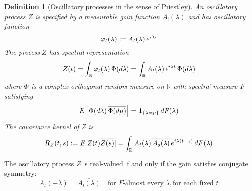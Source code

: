 \documentclass{article}
\newcommand{\assign}{:=}
\newtheorem{definition}{Definition}
{\theorembodyfont{\rmfamily}\newtheorem{remark}{Remark}}
\begin{document}
\begin{definition}
  [Oscillatory processes in the sense of Priestley] An oscillatory process $Z$
  is specified by a measurable gain function $A_t (\lambda)$ and has
  oscillatory function
  \begin{equation}
    \varphi_t (\lambda) \assign A_t (\lambda)  \hspace{0.17em} e^{i \lambda t}
  \end{equation}
  The process $Z$ has spectral representation
  \begin{equation}
    Z (t) = \int_{\mathbb{R}} \varphi_t (\lambda)  \hspace{0.17em} \Phi (d
    \lambda) = \int_{\mathbb{R}} A_t (\lambda)  \hspace{0.17em} e^{i \lambda
    t}  \hspace{0.17em} \Phi (d \lambda)
  \end{equation}
  where $\Phi$ is a complex orthogonal random measure on $\mathbb{R}$ with
  spectral measure $F$ satisfying
  \begin{equation}
    E \left[ \Phi (d \lambda) \hspace{0.17em} \overline{\Phi (d \mu)} \right]
    = \textbf{1}_{\{\lambda = \mu\}}  \hspace{0.17em} dF (\lambda)
  \end{equation}
  The covariance kernel of $Z$ is
  \begin{equation}
    R_Z (t, s) \assign E [Z (t) \overline{Z (s)}] = \int_{\mathbb{R}} A_t
    (\lambda) \hspace{0.17em} \overline{A_s (\lambda)} \hspace{0.17em} e^{i
    \lambda (t - s)}  \hspace{0.17em} dF (\lambda)
  \end{equation}
\end{definition}

\begin{remark}
   The oscillatory process $Z$ is real-valued if
  and only if the gain satisfies conjugate symmetry:
  \begin{equation}
    A_t  (- \lambda) = \overline{A_t (\lambda)} \quad \text{for $F$-almost
    every } \lambda, \text{for each fixed } t
  \end{equation}
\end{remark}
\end{document}
